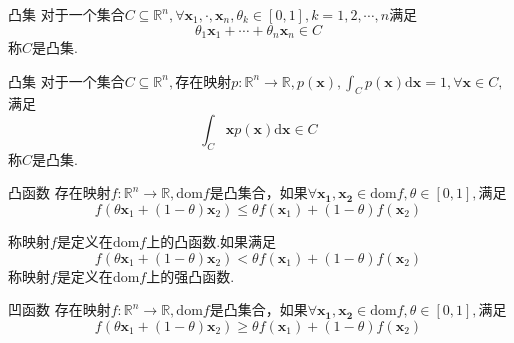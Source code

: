
\begin{definition}{凸集}
对于一个集合$C\subseteq\mathbb{R}^n,\forall\boldsymbol{x}_1,\cdot,\boldsymbol{x}_n,\theta_k\in[0,1],k=1,2,\cdots,n$满足
\begin{equation}
\theta_1\boldsymbol{x}_1+\cdots+\theta_n\boldsymbol{x}_n\in C~
\end{equation}
称$C$是凸集.
\end{definition}
\begin{definition}{凸集}
对于一个集合$C\subseteq\mathbb{R}^n,$存在映射$p:\mathbb{R}^n\to\mathbb{R},p(\boldsymbol{x}),\int_Cp(\boldsymbol{x})\mathrm{d}\boldsymbol{x}=1,\forall\boldsymbol{x}\in C,$满足
\begin{equation}
\int_C\boldsymbol{x}p(\boldsymbol{x})\mathrm{d}\boldsymbol{x}\in C~
\end{equation}
称$C$是凸集.
\end{definition}
\begin{definition}{凸函数}
存在映射$f:\mathbb{R}^n\to\mathbb{R},\mathrm{dom} f$是凸集合，如果$\forall\boldsymbol{x_1},\boldsymbol{x_2}\in\mathrm{dom} f, \theta\in[0,1],$满足
\begin{equation}
f(\theta\boldsymbol{x}_1+(1-\theta)\boldsymbol{x}_2)\leqslant\theta f(\boldsymbol{x}_1) + (1-\theta)f(\boldsymbol{x}_2)~
\end{equation}
\end{definition}
称映射$f$是定义在$\mathrm{dom} f$上的凸函数.如果满足
\begin{equation}
f(\theta\boldsymbol{x}_1+(1-\theta)\boldsymbol{x}_2)<\theta f(\boldsymbol{x}_1) + (1-\theta)f(\boldsymbol{x}_2)~
\end{equation}
称映射$f$是定义在$\mathrm{dom} f$上的强凸函数.
\begin{definition}{凹函数}
存在映射$f:\mathbb{R}^n\to\mathbb{R},\mathrm{dom} f$是凸集合，如果$\forall\boldsymbol{x_1},\boldsymbol{x_2}\in\mathrm{dom} f, \theta\in[0,1],$满足
\begin{equation}
f(\theta\boldsymbol{x}_1+(1-\theta)\boldsymbol{x}_2)\geqslant\theta f(\boldsymbol{x}_1) + (1-\theta)f(\boldsymbol{x}_2)~
\end{equation}
\end{definition}
